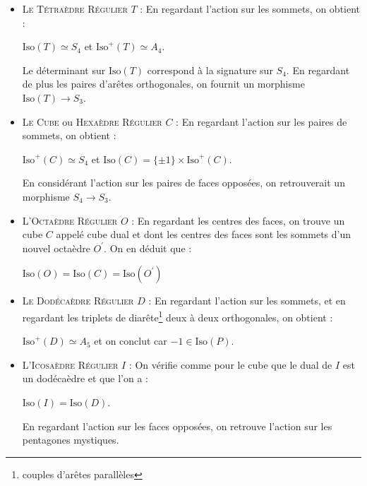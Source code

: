 \documentclass{cours}
\begin{document}
\begin{itemize}
    \item \textsc{Le Tétraèdre Régulier} $T$ : En regardant l'action sur les sommets, on obtient :
          \begin{proposition}
              $\text{Iso}(T) \simeq S_{4}$ et $\text{Iso}^{+}(T) \simeq A_{4}$.
          \end{proposition} Le déterminant sur $\text{Iso}(T)$ correspond à la signature sur $S_{4}$. En regardant de plus les paires d'arêtes orthogonales, on fournit un morphisme $\text{Iso}(T) \rightarrow S_{3}$.
    \item \textsc{Le Cube} ou \textsc{Hexaèdre Régulier} $C$ : En regardant l'action sur les paires de sommets, on obtient :
          \begin{proposition}
              $\text{Iso}^{+}(C) \simeq S_{4}$ et $\text{Iso}(C) = \{\pm 1\} \times \text{Iso}^{+}(C)$.
          \end{proposition}
          En considérant l'action sur les paires de faces opposées, on retrouverait un morphisme $S_{4} \rightarrow S_{3}$.
    \item \textsc{L'Octaèdre Régulier} $O$ : En regardant les centres des faces, on trouve un cube $C$ appelé cube dual et dont les centres des faces sont les sommets d'un nouvel octaèdre $O^{'}$. On en déduit que :
          \begin{proposition}
              $\text{Iso}(O) = \text{Iso}(C) = \text{Iso}(O^{'})$
          \end{proposition}
    \item \textsc{Le Dodécaèdre Régulier} $D$ : En regardant l'action sur les sommets, et en regardant les triplets de diarête\footnote{couples d'arêtes parallèles} deux à deux orthogonales, on obtient :
          \begin{proposition}
              $\text{Iso}^{+}(D) \simeq A_{5}$ et on conclut car $-1 \in \text{Iso}(P)$.
          \end{proposition}
    \item \textsc{L'Icosaèdre Régulier} $I$ : On vérifie comme pour le cube que le dual de $I$ est un dodécaèdre et que l'on a :
          \begin{proposition}
              $\text{Iso}(I) = \text{Iso}(D)$.
          \end{proposition}
          En regardant l'action sur les faces opposées, on retrouve l'action sur les pentagones mystiques.
\end{itemize}
\end{document}
